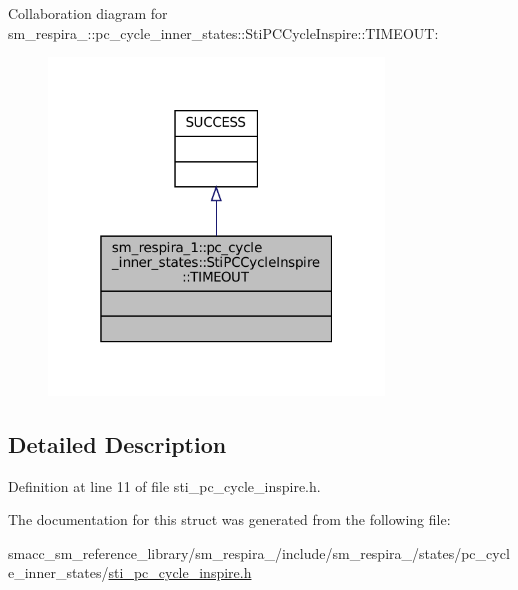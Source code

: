 Collaboration diagram for sm\+\_\+respira\+\_\+:\+:pc\+\_\+cycle\+\_\+inner\+\_\+states\+:\+:Sti\+P\+C\+Cycle\+Inspire\+:\+:T\+I\+M\+E\+O\+UT\+:
\nopagebreak
\begin{figure}[H]
\begin{center}
\leavevmode
\includegraphics[width=253pt]{structsm__respira__1_1_1pc__cycle__inner__states_1_1StiPCCycleInspire_1_1TIMEOUT__coll__graph}
\end{center}
\end{figure}


\subsection{Detailed Description}


Definition at line 11 of file sti\+\_\+pc\+\_\+cycle\+\_\+inspire.\+h.



The documentation for this struct was generated from the following file\+:\begin{DoxyCompactItemize}
\item 
smacc\+\_\+sm\+\_\+reference\+\_\+library/sm\+\_\+respira\+\_/include/sm\+\_\+respira\+\_/states/pc\+\_\+cycle\+\_\+inner\+\_\+states/\hyperlink{sti__pc__cycle__inspire_8h}{sti\+\_\+pc\+\_\+cycle\+\_\+inspire.\+h}\end{DoxyCompactItemize}

